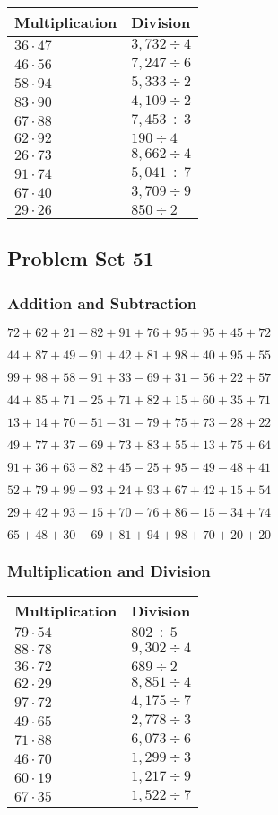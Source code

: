 \begin{longtable}[]{@{}ll@{}}
\toprule
Multiplication & Division\tabularnewline
\midrule
\endhead
\(36\cdot47\) & \(3,732 ÷4\)\tabularnewline
\(46\cdot56\) & \(7,247÷6\)\tabularnewline
\(58\cdot94\) & \(5,333÷2\)\tabularnewline
\(83\cdot90\) & \(4,109÷2\)\tabularnewline
\(67\cdot88\) & \(7,453÷3\)\tabularnewline
\(62\cdot92\) & \(190÷4\)\tabularnewline
\(26\cdot73\) & \(8,662÷4\)\tabularnewline
\(91\cdot74\) & \(5,041÷7\)\tabularnewline
\(67\cdot40\) & \(3,709÷9\)\tabularnewline
\(29\cdot26\) & \(850÷2\)\tabularnewline
\bottomrule
\end{longtable}

\hypertarget{problem-set-51}{%
\subsection{Problem Set 51}\label{problem-set-51}}

\hypertarget{addition-and-subtraction-91}{%
\subsubsection{Addition and
Subtraction}\label{addition-and-subtraction-91}}

\(72+62+21+82+91+76+95+95+45+ 72\)

\(44+87+49+91+42+81+98+40+95+55\)

\(99+98+58-91+33-69+31-56+22+57\)

\(44+85+71+25+71+82+15+60+35+71\)

\(13+14+70+51-31-79+75+73-28+22\)

\(49+77+37+69+73+83+55+13+75+64\)

\(91+36+63+82+45-25+95-49-48+41\)

\(52+79+99+93+24+93+67+42+15+54\)

\(29+42+93+15+70-76+86-15-34+74\)

\(65+48+30+69+81+94+98+70+20+20\)

\hypertarget{multiplication-and-division-91}{%
\subsubsection{Multiplication and
Division}\label{multiplication-and-division-91}}

\begin{longtable}[]{@{}ll@{}}
\toprule
Multiplication & Division\tabularnewline
\midrule
\endhead
\(79\cdot54\) & \(802÷5\)\tabularnewline
\(88\cdot78\) & \(9,302÷4\)\tabularnewline
\(36\cdot72\) & \(689÷2\)\tabularnewline
\(62\cdot29\) & \(8,851÷4\)\tabularnewline
\(97\cdot72\) & \(4,175÷7\)\tabularnewline
\(49\cdot65\) & \(2,778÷3\)\tabularnewline
\(71\cdot88\) & \(6,073÷6\)\tabularnewline
\(46\cdot70\) & \(1,299÷3\)\tabularnewline
\(60\cdot19\) & \(1,217 ÷9\)\tabularnewline
\(67\cdot35\) & \(1,522÷7\)\tabularnewline
\bottomrule
\end{longtable}

